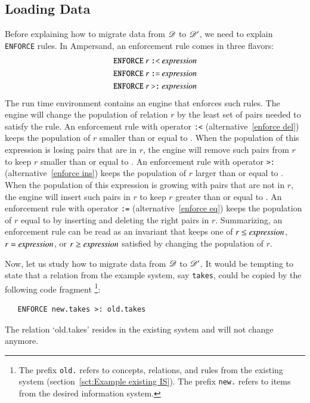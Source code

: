 \documentclass{elsarticle}
\begin{document}
\subsection{Loading Data}
   Before explaining how to migrate data from $\mathscr{D}$ to $\mathscr{D}'$, we need to explain {\tt ENFORCE} rules.
   In Ampersand, an enforcement rule comes in three flavors:
\begin{eqnarray}
   \text{\tt ENFORCE}\ r\ \text{\tt :<}\ \id{expression}\label{enforce del}\\
   \text{\tt ENFORCE}\ r\ \text{\tt :=}\ \id{expression}\label{enforce eq}\\
   \text{\tt ENFORCE}\ r\ \text{\tt >:}\ \id{expression}\label{enforce ins}
\end{eqnarray}
   The run time environment contains an engine that enforces such rules.
   The engine will change the population of relation $r$ by the least set of pairs needed to satisfy the rule.
   An enforcement rule with operator {\tt :<} (alternative~\ref{enforce del}) keeps the population of $r$ smaller than or equal to .
   When the population of this expression is losing pairs that are in $r$, the engine will remove such pairs from $r$ to keep $r$ smaller than or equal to .
   An enforcement rule with operator {\tt >:} (alternative~\ref{enforce ins}) keeps the population of $r$ larger than or equal to .
   When the population of this expression is growing with pairs that are not in $r$, the engine will insert such pairs in $r$ to keep $r$ greater than or equal to .
   An enforcement rule with operator {\tt :=} (alternative~\ref{enforce eq}) keeps the population of $r$ equal to  by inserting and deleting the right pairs in $r$.
   Summarizing, an enforcement rule can be read as an invariant that keeps one of $r\leq\text{\it expression\/}$, $r=\text{\it expression\/}$, or $r\geq\text{\it expression\/}$ satisfied by changing the population of $r$.

   Now, let us study how to migrate data from $\mathscr{D}$ to $\mathscr{D}'$.
   It would be tempting to state that a relation from the example system, say {\tt takes}, could be copied by the following code fragment%
\footnote{The prefix {\tt old.} refers to concepts, relations, and rules from the existing system (section~\ref{sct:Example existing IS}).
The prefix {\tt new.} refers to items from the desired information system.}:
\begin{verbatim}
   ENFORCE new.takes >: old.takes
\end{verbatim}
   The relation `old.takes' resides in the existing system and will not change anymore.
   
\end{document}
